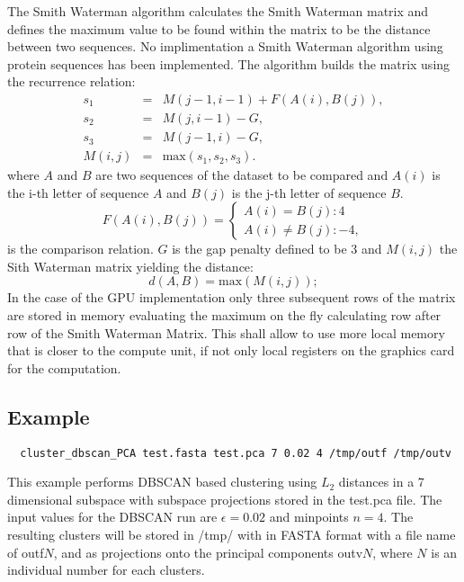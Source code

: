 The Smith Waterman algorithm calculates the Smith Waterman matrix and
defines the maximum value to be found within the matrix to be the
distance between two sequences. No implimentation a Smith Waterman
algorithm using protein sequences has been implemented. The algorithm
builds the matrix using the recurrence relation:
\begin{eqnarray}
s_1&=&M(j-1,i-1)+F(A(i),B(j)), \\ \nonumber
s_2&=&M(j,i-1)-G, \\ \nonumber
s_3&=&M(j-1,i)-G, \\ \nonumber
M(i,j)&=&\mathrm{max}(s_1,s_2,s_3).
\end{eqnarray}
where $A$ and $B$ are two sequences of the dataset to be compared and
$A(i)$ is the i-th letter of sequence $A$ and $B(j)$ is the j-th
letter of sequence $B$.
\begin{equation}
  F(A(i),B(j)) = \left\{
    \begin{array}{l}
      A(i) = B(j) : 4 \\
      A(i) \neq B(j) : -4,
    \end{array} \right.
\end{equation}
is the comparison relation. $G$ is the gap penalty defined to be 3 and
$M(i,j)$ the Sith Waterman matrix yielding the distance:
\begin{equation}
  d(A,B) = \mathrm{max}(M(i,j));
\end{equation}
In the case of the GPU implementation only three subsequent rows of
the matrix are stored in memory evaluating the maximum on the fly
calculating row after row of the Smith Waterman Matrix. This shall
allow to use more local memory that is closer to the compute unit, if
not only local registers on the graphics card for the computation.

\subsection{Example}

\begin{lstlisting}
  cluster_dbscan_PCA test.fasta test.pca 7 0.02 4 /tmp/outf /tmp/outv
\end{lstlisting}
This example performs DBSCAN based clustering using $L_2$ distances in
a 7 dimensional subspace with subspace projections stored in the
test.pca file. The input values for the DBSCAN run are $\epsilon=0.02$
and minpoints $n=4$. The resulting clusters will be stored in /tmp/
with in FASTA format with a file name of outf$N$, and as projections
onto the principal components outv$N$, where $N$ is an individual
number for each clusters. 

